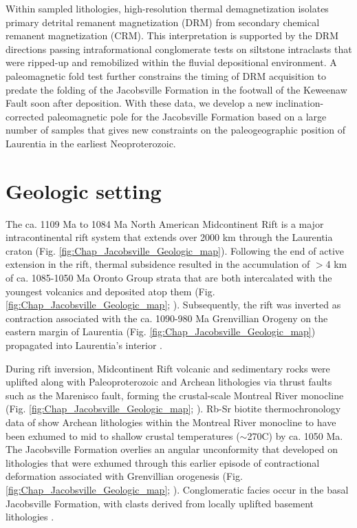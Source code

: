 Within sampled lithologies, high-resolution thermal demagnetization isolates primary detrital remanent magnetization (DRM) from secondary chemical remanent magnetization (CRM). This interpretation is supported by the DRM directions passing intraformational conglomerate tests on siltstone intraclasts that were ripped-up and remobilized within the fluvial depositional environment. A paleomagnetic fold test further constrains the timing of DRM acquisition to predate the folding of the Jacobsville Formation in the footwall of the Keweenaw Fault soon after deposition. With these data, we develop a new inclination-corrected paleomagnetic pole for the Jacobsville Formation based on a large number of samples that gives new constraints on the paleogeographic position of Laurentia in the earliest Neoproterozoic.

\section*{Geologic setting}

The ca. 1109 Ma to 1084 Ma North American Midcontinent Rift is a major intracontinental rift system that extends over 2000 km through the Laurentia craton (Fig. \ref{fig:Chap_Jacobsville_Geologic_map}). Following the end of active extension in the rift, thermal subsidence resulted in the accumulation of $>$4 km of ca. 1085-1050 Ma Oronto Group strata that are both intercalated with the youngest volcanics and deposited atop them (Fig. \ref{fig:Chap_Jacobsville_Geologic_map}; \citealp{Daniels1982a, Cannon1989a}). Subsequently, the rift was inverted as contraction associated with the ca. 1090-980 Ma Grenvillian Orogeny on the eastern margin of Laurentia (Fig. \ref{fig:Chap_Jacobsville_Geologic_map}) propagated into Laurentia's interior \citep{Cannon1993a, Cannon1994a, Hodgin2022a, Swanson-Hysell2023a}. 

During rift inversion, Midcontinent Rift volcanic and sedimentary rocks were uplifted along with Paleoproterozoic and Archean lithologies via thrust faults such as the Marenisco fault, forming the crustal-scale Montreal River monocline (Fig. \ref{fig:Chap_Jacobsville_Geologic_map}; \cite{Cannon1993a}). Rb-Sr biotite thermochronology data of \cite{Cannon1993a} show Archean lithologies within the Montreal River monocline to have been exhumed to mid to shallow crustal temperatures ($\sim$270\textdegree C) by ca. 1050 Ma. The Jacobsville Formation overlies an angular unconformity that developed on lithologies that were exhumed through this earlier episode of contractional deformation associated with Grenvillian orogenesis (Fig. \ref{fig:Chap_Jacobsville_Geologic_map}; \citealp{Hamblin1958a, Cannon1993a, Kalliokoski1982a}). Conglomeratic facies occur in the basal Jacobsville Formation, with clasts derived from locally uplifted basement lithologies \citep{Irving1885a, Hamblin1958a, Kalliokoski1982a}.

